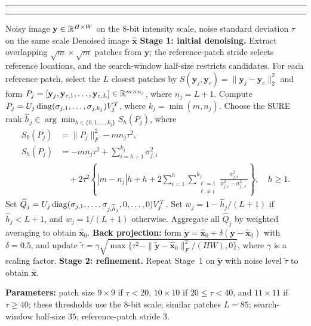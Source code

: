 \begin{center}
\begin{minipage}{0.88\textwidth}
\label{alg:sure-svd}
\hrule
\vspace{0.25em}
\vspace{0.25em}
\hrule
\vspace{0.25em}
{\tiny
\begin{algorithmic}[1]
\REQUIRE Noisy image $\mathbf y\in\mathbb{R}^{H\times W}$ on the 8-bit intensity scale, noise standard deviation $\tau$ on the same scale
\ENSURE Denoised image $\widehat{\mathbf x}$
\STATE \textbf{Stage 1: initial denoising.}
\STATE Extract overlapping $\sqrt m\times\sqrt m$ patches from $\mathbf y$; the reference-patch stride selects reference locations, and the search-window half-size restricts candidates. For each reference patch, select the $L$ closest patches by $S(\mathbf y_j,\mathbf y_c)=\|\mathbf y_j-\mathbf y_c\|_2^2$ and form $P_j=[\mathbf y_j,\mathbf y_{c,1},\ldots,\mathbf y_{c,L}]\in\mathbb{R}^{m\times n_j}$, where $n_j=L+1$.
    \STATE Compute $P_j=U_j\operatorname{diag}(\sigma_{j,1},\ldots,\sigma_{j,k_j})V_j^T$, where $k_j=\min(m,n_j)$.
    \STATE Choose the SURE rank $\widehat h_j\in\arg\min_{h\in\{0,1,\ldots,k_j\}}S_h(P_j)$, where
    \[
    \begin{aligned}
    S_0(P_j)&=\|P_j\|_F^2-m n_j\tau^2,\\[-0.2em]
    S_h(P_j)&=-m n_j\tau^2+\sum_{i=h+1}^{k_j}\sigma_{j,i}^2 \\
    &\quad +2\tau^2\left\{|m-n_j|h+h
    +2\sum_{i=1}^{h}\sum_{\substack{\ell=1\\ \ell\neq i}}^{k_j}
    \frac{\sigma_{j,i}^2}{\sigma_{j,i}^2-\sigma_{j,\ell}^2}\right\},\quad h\geq1.
    \end{aligned}
    \]
    \STATE Set $\widehat Q_j=U_j\operatorname{diag}(\sigma_{j,1},\ldots,\sigma_{j,\widehat h_j},0,\ldots,0)V_j^T$.
    \STATE Set $w_j=1-\widehat h_j/(L+1)$ if $\widehat h_j<L+1$, and $w_j=1/(L+1)$ otherwise.
\ENDFOR
\STATE Aggregate all $\widehat Q_j$ by weighted averaging to obtain $\widehat{\mathbf x}_0$.
\STATE \textbf{Back projection:} form $\widetilde{\mathbf y}=\widehat{\mathbf x}_0+\delta(\mathbf y-\widehat{\mathbf x}_0)$ with $\delta=0.5$, and update $\widetilde\tau=\gamma\sqrt{\max\{\tau^2-\|\widetilde{\mathbf y}-\widehat{\mathbf x}_0\|_F^2/(HW),0\}}$, where $\gamma$ is a scaling factor.
\STATE \textbf{Stage 2: refinement.} Repeat Stage~1 on $\widetilde{\mathbf y}$ with noise level $\widetilde\tau$ to obtain $\widehat{\mathbf x}$.
\end{algorithmic}
\medskip
\noindent\textbf{Parameters:} patch size $9\times9$ if $\tau<20$, $10\times10$ if $20\leq\tau<40$, and $11\times11$ if $\tau\geq40$; these thresholds use the 8-bit scale; similar patches $L=85$; search-window half-size $35$; reference-patch stride $3$.

}
\end{minipage}
\end{center}
